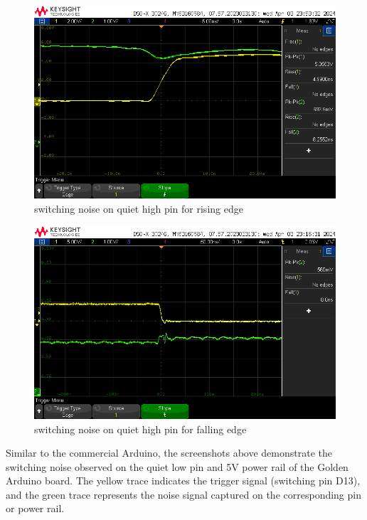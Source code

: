 \documentclass[a4paper,11pt]{article}%
\begin{document}
\begin{enumerate}
\begin{itemize}
		            \begin{figure}[H]
			            \centering
			            \includegraphics[scale=0.6]{figures/my_ard/d13_trig_qh_rise.png}
			            \caption{switching noise on quiet high pin for rising edge}
		            \end{figure}

					\begin{figure}[H]
			            \centering
			            \includegraphics[scale=0.6]{figures/commercial_ard/d13_trig_qh_fall.png}
			            \caption{switching noise on quiet high pin for falling edge}
		            \end{figure}
		            

		            Similar to the commercial Arduino, the screenshots above demonstrate the switching noise observed on the quiet low pin and 5V power rail of the Golden Arduino board. The yellow trace indicates the trigger signal (switching pin D13), and the green trace represents the noise signal captured on the corresponding pin or power rail.
	      \end{itemize}


\end{enumerate}
\end{document}
